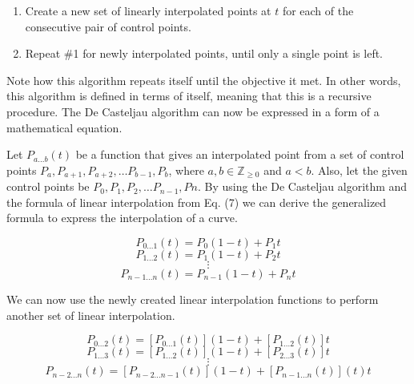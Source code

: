 \documentclass[12pt, oneside]{article}   	%
\numberwithin{figure}{section}
\begin{document}
\begin{enumerate}
\item Create a new set of linearly interpolated points at \(t\) for each of the consecutive pair of control points.
\item Repeat \#1 for newly interpolated points, until only a single point is left.
\end{enumerate}

Note how this algorithm repeats itself until the objective it met. In other words, this algorithm is defined in terms of itself, meaning that this is a recursive procedure. The De Casteljau algorithm can now be expressed in a form of a mathematical equation.

Let \(P_{a...b}(t)\) be a function that gives an interpolated point from a set of control points \(P_a, P_{a+1}, P_{a+2}, \ldots P_{b-1}, P_{b}\), where \(a, b \in \mathbb{Z}_{\geq0}\) and \(a < b\). Also, let the given control points be \(P_0, P_1, P_2, \ldots P_{n-1}, P{n}\). By using the De Casteljau algorithm and the formula of linear interpolation from Eq. (7) we can derive the generalized formula to express the interpolation of a curve.

\begin{displaymath}
P_{0...1}(t)=P_{0}(1-t)+P_{1}t
\end{displaymath}
\begin{displaymath}
P_{1...2}(t)=P_{1}(1-t)+P_{2}t
\end{displaymath}
\begin{displaymath}
\vdots
\end{displaymath}
\begin{displaymath}
P_{n-1...n}(t)=P_{n-1}(1-t)+P_{n}t
\end{displaymath}

We can now use the newly created linear interpolation functions to perform another set of linear interpolation.

\begin{displaymath}
P_{0...2}(t)=[P_{0...1}(t)](1-t)+[P_{1...2}(t)]t
\end{displaymath}
\begin{displaymath}
P_{1...3}(t)=[P_{1...2}(t)](1-t)+[P_{2...3}(t)]t
\end{displaymath}
\begin{displaymath}
\vdots
\end{displaymath}
\begin{displaymath}
P_{n-2...n}(t)=[P_{n-2...n-1}(t)](1-t)+[P_{n-1...n}(t)](t)t
\end{displaymath}
\end{document}
